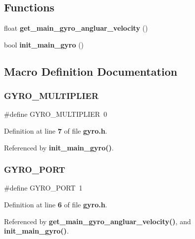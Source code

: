 \subsection*{Functions}
\begin{DoxyCompactItemize}
\item 
float \textbf{ get\+\_\+main\+\_\+gyro\+\_\+angluar\+\_\+velocity} ()
\item 
bool \textbf{ init\+\_\+main\+\_\+gyro} ()
\end{DoxyCompactItemize}


\subsection{Macro Definition Documentation}
\mbox{\label{gyro_8h_a482017cc25be9213fef3222112eb1c7f}} 
\subsubsection{G\+Y\+R\+O\+\_\+\+M\+U\+L\+T\+I\+P\+L\+I\+ER}
{\footnotesize\ttfamily \#define G\+Y\+R\+O\+\_\+\+M\+U\+L\+T\+I\+P\+L\+I\+ER~0}



Definition at line \textbf{ 7} of file \textbf{ gyro.\+h}.



Referenced by \textbf{ init\+\_\+main\+\_\+gyro()}.

\mbox{\label{gyro_8h_a51d281e7676749d34aab3f8ba6fab960}} 
\subsubsection{G\+Y\+R\+O\+\_\+\+P\+O\+RT}
{\footnotesize\ttfamily \#define G\+Y\+R\+O\+\_\+\+P\+O\+RT~1}



Definition at line \textbf{ 6} of file \textbf{ gyro.\+h}.



Referenced by \textbf{ get\+\_\+main\+\_\+gyro\+\_\+angluar\+\_\+velocity()}, and \textbf{ init\+\_\+main\+\_\+gyro()}.



